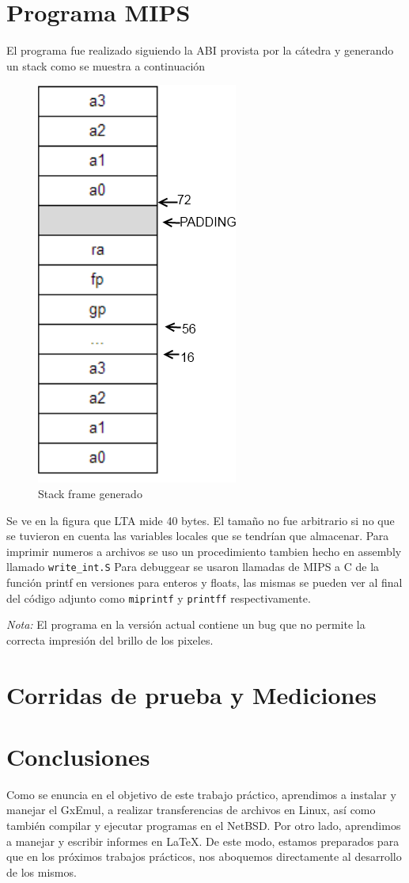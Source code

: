 \documentclass[a4paper,10pt,oneside]{article}
\begin{document}
	\section{Programa MIPS}
	El programa fue realizado siguiendo la ABI provista por la cátedra y generando un stack como se muestra a continuación
	\begin{figure}[H]
		\begin{center}
			\includegraphics[height=0.50\textwidth]{ABI.png}
		\end{center}
		\caption{Stack frame generado} \label{Figura 1}
	\end{figure}
	Se ve en la figura que LTA mide 40 bytes. El tamaño no fue arbitrario si no que se tuvieron en cuenta las variables locales que se tendrían que almacenar.
	Para imprimir numeros a archivos se uso un procedimiento tambien hecho en assembly llamado \texttt{write\_int.S}
	Para debuggear se usaron llamadas de MIPS a C de la función printf en versiones para enteros y floats, las mismas se pueden ver al final del código adjunto como \texttt{miprintf} y \texttt{printff} respectivamente.
	
	\emph{Nota:} El programa en la versión actual contiene un bug que no permite la correcta impresión del brillo de los pixeles.  


	
	
\section{Corridas de prueba y Mediciones}



\section{Conclusiones}	
	Como se enuncia en el objetivo de este trabajo práctico, aprendimos a instalar y manejar el GxEmul, a realizar transferencias de archivos en Linux, así como también compilar y ejecutar programas en el NetBSD. Por otro lado,  aprendimos a manejar y escribir informes en \LaTeX{}.
	De este modo, estamos preparados para que en los próximos trabajos prácticos, nos aboquemos directamente al desarrollo de los mismos.
\end{document}
